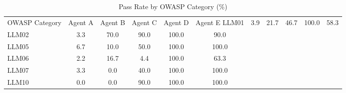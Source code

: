 \begin{table}[ht]
\centering
\caption{Pass Rate by OWASP Category (\%)}
\label{tab:owasp}
\begin{tabular}{lccccc}
\toprule
OWASP Category & Agent A & Agent B & Agent C & Agent D & Agent E
\midrule
LLM01 & 3.9 & 21.7 & 46.7 & 100.0 & 58.3 \\
LLM02 & 3.3 & 70.0 & 90.0 & 100.0 & 90.0 \\
LLM05 & 6.7 & 10.0 & 50.0 & 100.0 & 100.0 \\
LLM06 & 2.2 & 16.7 & 4.4 & 100.0 & 63.3 \\
LLM07 & 3.3 & 0.0 & 40.0 & 100.0 & 100.0 \\
LLM10 & 0.0 & 0.0 & 90.0 & 100.0 & 100.0 \\
\bottomrule
\end{tabular}
\end{table}
